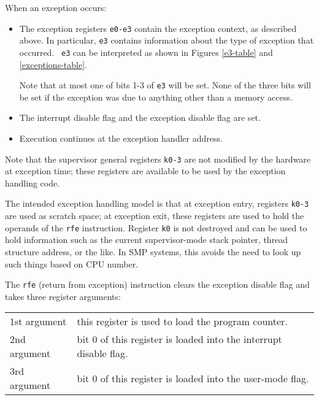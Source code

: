 When an exception occurs:

\begin{itemize}

\item The exception registers {\tt e0-e3} contain the exception
	context, as described above.  In particular, {\tt e3} contains
	information about the type of exception that occurred.  {\tt
	e3} can be interpreted as shown in Figures \ref{e3-table} and
	\ref{exceptions-table}.

	Note that at most one of bits 1-3 of {\tt e3} will be set. 
	None of the three bits will be set if the exception was due to
	anything other than a memory access.

\item The interrupt disable flag and the exception disable flag are
	set.

\item Execution continues at the exception handler address.

\end{itemize}

Note that the supervisor general registers {\tt k0-3} are not modified
by the hardware at exception time; these registers are available to be
used by the exception handling code.

The intended exception handling model is that at exception entry,
registers {\tt k0-3} are used as scratch space; at exception exit,
these registers are used to hold the operands of the {\tt rfe}
instruction.  Register {\tt k0} is not destroyed and can be used to
hold information such as the current supervisor-mode stack pointer,
thread structure address, or the like.  In SMP systems, this avoids
the need to look up such things based on CPU number.

The {\tt rfe} (return from exception) instruction clears the exception
disable flag and takes three register arguments:

\begin{center}
\begin{tabular}{l l}
1st argument	&this register is used to load the program counter.\\
2nd argument	&bit 0 of this register is loaded into the interrupt disable flag.\\
3rd argument	&bit 0 of this register is loaded into the user-mode flag.\\
\end{tabular}
\end{center}

